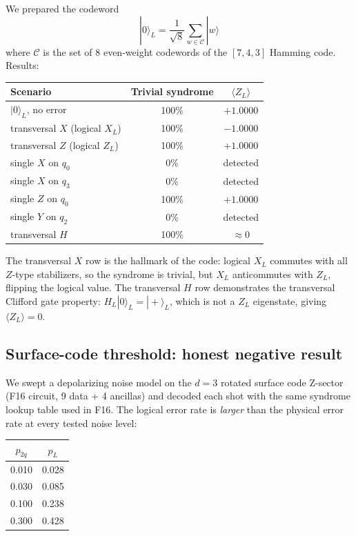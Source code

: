 \documentclass[11pt,aps,prl,twocolumn]{revtex4-2}
\begin{document}
We prepared the codeword
\begin{equation}
|0\rangle_L = \frac{1}{\sqrt{8}} \sum_{w \in \mathcal{C}} |w\rangle
\end{equation}
where $\mathcal{C}$ is the set of 8 even-weight codewords of the
$[7,4,3]$ Hamming code.  Results:

\begin{center}
\begin{tabular}{lcc}
\hline
Scenario & Trivial syndrome & $\langle Z_L \rangle$ \\
\hline
$|0\rangle_L$, no error & 100\% & $+1.0000$ \\
transversal $X$ (logical $X_L$) & 100\% & $-1.0000$ \\
transversal $Z$ (logical $Z_L$) & 100\% & $+1.0000$ \\
single $X$ on $q_0$ & 0\% & detected \\
single $X$ on $q_3$ & 0\% & detected \\
single $Z$ on $q_0$ & 100\% & $+1.0000$ \\
single $Y$ on $q_2$ & 0\% & detected \\
transversal $H$ & 100\% & $\approx 0$ \\
\hline
\end{tabular}
\end{center}

The transversal $X$ row is the hallmark of the code: logical
$X_L$ commutes with all $Z$-type stabilizers, so the syndrome is
trivial, but $X_L$ anticommutes with $Z_L$, flipping the logical
value.  The transversal $H$ row demonstrates the transversal
Clifford gate property: $H_L |0\rangle_L = |+\rangle_L$, which
is not a $Z_L$ eigenstate, giving $\langle Z_L \rangle = 0$.

\subsection{Surface-code threshold: honest negative result}

We swept a depolarizing noise model on the $d = 3$ rotated
surface code Z-sector (F16 circuit, 9 data + 4 ancillas) and
decoded each shot with the same syndrome lookup table used in
F16.  The logical error rate is \emph{larger} than the physical
error rate at every tested noise level:

\begin{center}
\begin{tabular}{cc}
\hline
$p_{2q}$ & $p_L$ \\
\hline
0.010 & 0.028 \\
0.030 & 0.085 \\
0.100 & 0.238 \\
0.300 & 0.428 \\
\hline
\end{tabular}
\end{center}
\end{document}
